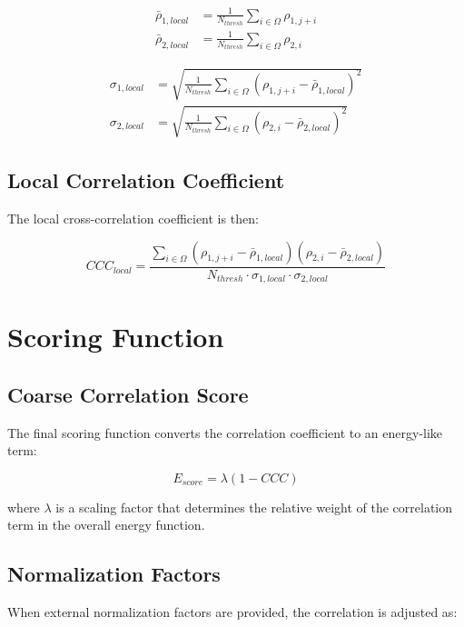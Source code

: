 \documentclass[12pt,a4paper]{article}
\begin{document}
\begin{align}
\bar{\rho}_{1,local} &= \frac{1}{N_{thresh}} \sum_{i \in \Omega} \rho_{1,j+i} \\
\bar{\rho}_{2,local} &= \frac{1}{N_{thresh}} \sum_{i \in \Omega} \rho_{2,i}
\end{align}

\begin{align}
\sigma_{1,local} &= \sqrt{\frac{1}{N_{thresh}} \sum_{i \in \Omega} (\rho_{1,j+i} - \bar{\rho}_{1,local})^2} \\
\sigma_{2,local} &= \sqrt{\frac{1}{N_{thresh}} \sum_{i \in \Omega} (\rho_{2,i} - \bar{\rho}_{2,local})^2}
\end{align}

\subsection{Local Correlation Coefficient}

The local cross-correlation coefficient is then:

\begin{equation}
CCC_{local} = \frac{\sum_{i \in \Omega} (\rho_{1,j+i} - \bar{\rho}_{1,local})(\rho_{2,i} - \bar{\rho}_{2,local})}{N_{thresh} \cdot \sigma_{1,local} \cdot \sigma_{2,local}}
\end{equation}

\section{Scoring Function}

\subsection{Coarse Correlation Score}

The final scoring function converts the correlation coefficient 
to an energy-like term:

\begin{equation}
E_{score} = \lambda (1 - CCC)
\end{equation}

where $\lambda$ is a scaling factor that determines the relative 
weight of the correlation term in the overall energy function.

\subsection{Normalization Factors}

When external normalization factors are provided, the correlation is adjusted as:
\end{document}
